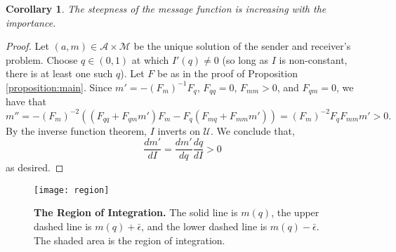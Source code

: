 \documentclass[12pt]{article}
\newtheorem{corollary}{Corollary}
\begin{document}
\begin{corollary}
The steepness of the message function is increasing with the importance.
\end{corollary}
\begin{proof}
Let $(a,m)\in\mathcal{A}\times\mathcal{M}$ be the unique solution of the sender and receiver's problem. Choose $q\in(0,1)$ at which $I'(q)\neq0$ (so long as $I$ is non-constant, there is at least one such $q$). Let $F$ be as in the proof of Proposition \ref{proposition:main}. Since $m'=-(F_{m})^{-1}F_{q}$, $F_{qq}=0$, $F_{mm}>0$, and $F_{qm}=0$, we have that
\begin{equation}
m''=-(F_{m})^{-2}((F_{qq}+F_{qm}m')F_{m}-F_{q}(F_{mq}+F_{mm}m'))=(F_{m})^{-2}F_{q}F_{mm}m'>0.
\end{equation}
By the inverse function theorem, $I$ inverts on $\mathcal{U}$. We conclude that, 
\begin{equation}
\frac{dm'}{dI}=\frac{dm'}{dq}\frac{dq}{dI}>0
\end{equation}
as desired.
\end{proof}
\pagebreak
\begin{figure}[H]
\begin{center}
\texttt{[image: region]}
\end{center}
\caption{\textbf{The Region of Integration.} The solid line is $m(q)$, the upper dashed line is $m(q)+\bar{\epsilon}$, and the lower dashed line is $m(q)-\bar{\epsilon}$. The shaded area is the region of integration.}
\label{figure:region}
\end{figure}
\end{document}
